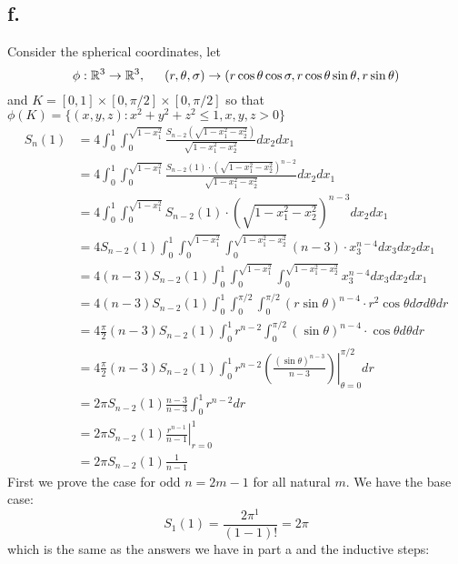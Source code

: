 \documentclass[11pt]{article}
\begin{document}
\subsection*{f.}
Consider the spherical coordinates, let
\[
    \phi: \mathbb{R}^3 \to \mathbb{R}^3, \indent (r, \theta, \sigma) \to (r\cos\theta\cos\sigma, r\cos\theta\sin\theta, r \sin \theta)
\]
and $K = [0, 1] \times [0, \pi/2] \times [0, \pi/2]$ so that \\
$\phi(K) = \{(x,y,z): x^2 + y^2 + z^2 \le 1, x,y,z> 0\}$
\begin{equation*}
    \begin{aligned}
        S_n(1) 
        &= 4 \int_0^1 \int_0^{\sqrt{1-x_1^2}} \frac{S_{n-2}(\sqrt{1-x_1^2-x_2^2})}{\sqrt{1-x_1^2-x_2^2}} dx_2 dx_1 \\
        &= 4 \int_0^1 \int_0^{\sqrt{1-x_1^2}} \frac{S_{n-2}(1) \cdot \left(\sqrt{1-x_1^2-x_2^2}\right)^{n-2}}{\sqrt{1-x_1^2-x_2^2}} dx_2 dx_1 \\
        &= 4 \int_0^1 \int_0^{\sqrt{1-x_1^2}} S_{n-2}(1) \cdot \left(\sqrt{1-x_1^2-x_2^2}\right)^{n-3} dx_2 dx_1 \\
        &= 4 S_{n-2}(1) \int_0^1 \int_0^{\sqrt{1-x_1^2}} \int_0^{\sqrt{1-x_1^2-x_2^2}} (n-3) \cdot x_3^{n-4} dx_3 dx_2 dx_1 \\
        &= 4 (n-3) S_{n-2}(1) \int_0^1 \int_0^{\sqrt{1-x_1^2}} \int_0^{\sqrt{1-x_1^2-x_2^2}}  x_3^{n-4} dx_3 dx_2 dx_1 \\
        &= 4 (n-3) S_{n-2}(1) \int_0^1 \int_0^{\pi/2} \int_0^{\pi/2} (r\sin\theta)^{n-4} \cdot r^2 \cos \theta d\sigma d \theta dr \\
        &= 4 \frac{\pi}{2}(n-3) S_{n-2}(1) \int_0^1 r^{n-2} \int_0^{\pi/2} (\sin\theta)^{n-4} \cdot \cos \theta d \theta dr \\
        &= 4 \frac{\pi}{2}(n-3) S_{n-2}(1) \int_0^1 r^{n-2} \left.\left(\frac{(\sin\theta)^{n-3}}{n-3}\right)\right|_{\theta = 0}^{\pi/2} dr \\ 
        &= 2\pi S_{n-2}(1) \frac{n-3}{n-3} \int_0^1 r^{n-2} dr \\
        &= 2\pi S_{n-2}(1) \left.\frac{r^{n-1}}{n-1}\right|_{r=0}^1 \\
        &= 2\pi S_{n-2}(1) \frac{1}{n-1}
    \end{aligned}
\end{equation*}
First we prove the case for odd $n = 2m-1$ for all natural $m$. We have the base case: 
\[
    S_1(1) = \frac{2\pi^1}{(1-1)!} = 2\pi    
\]
which is the same as the answers we have in part a and the inductive steps: \\
\end{document}
